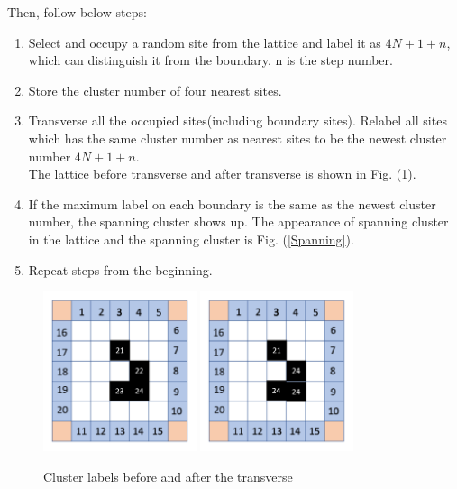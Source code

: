 \documentclass[12pt]{article}
\begin{document}
Then, follow below steps: 
\begin{enumerate}
  \item Select and occupy a random site from the lattice and label it as $4N+1+n$, which can distinguish it from the boundary. n is the step number. 
  \item Store the cluster number of four nearest sites. 
  \item Transverse all the occupied sites(including boundary sites). Relabel all sites which has the same cluster number as nearest sites to be the newest cluster number $4N+1+n$. \\
        The lattice before transverse and after transverse is shown in Fig. (\ref{Boundary2}). 
  \item If the maximum label on each boundary is the same as the newest cluster number, the spanning cluster shows up. The appearance of spanning cluster in the lattice and the spanning cluster is Fig. (\ref{Spanning}). 
  \item Repeat steps from the beginning. 
\end{enumerate}
\begin{figure}[h]
\centering
\includegraphics[width=0.4\textwidth]{Boundary2}
\includegraphics[width=0.4\textwidth]{Boundary3}
\caption{Cluster labels before and after the transverse}
\label{Boundary2}
\end{figure}
\end{document}
